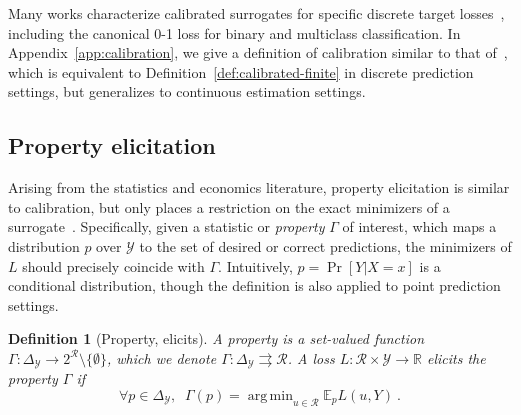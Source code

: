 \documentclass{article}
\newcommand{\Comments}{1}
\newcommand{\mynote}[2]{\ifnum\Comments=1\textcolor{#1}{#2}\fi}
\newcommand{\mytodo}[2]{\ifnum\Comments=1%
	\todo[linecolor=#1!80!black,backgroundcolor=#1,bordercolor=#1!80!black]{#2}\fi}
\newcommand{\raft}[1]{\mytodo{green!20!white}{RF: #1}}
\newcommand{\jessie}[1]{\mynote{purple}{[JF: #1]}}
\newcommand{\jessiet}[1]{\mytodo{purple!20!white}{JF: #1}}
\newcommand{\reals}{\mathbb{R}}
\newcommand{\simplex}{\Delta_\Y}
\newcommand{\E}{\mathbb{E}}
\newcommand{\R}{\mathcal{R}}
\newcommand{\Y}{\mathcal{Y}}
\newcommand{\exploss}[3]{\E_{#3} #1(#2,Y)}
\newcommand{\toto}{\rightrightarrows}
\newtheorem{definition}{Definition}
\DeclareMathOperator*{\argmin}{arg\,min}
\begin{document}
Many works characterize calibrated surrogates for specific discrete target losses~\citep{zhang2004statistical,lin2004note,bartlett2006convexity,tewari2007consistency}, including the canonical 0-1 loss for binary and multiclass classification.
In Appendix~\ref{app:calibration}, we give a definition of calibration similar to that of~\citet{steinwart2008support}, which is equivalent to Definition~\ref{def:calibrated-finite} in discrete prediction settings, but generalizes to continuous estimation settings.


\subsection{Property elicitation}\label{subsec:properties}
Arising from the statistics and economics literature, property elicitation is similar to calibration, but only places a restriction on the exact minimizers of a surrogate~\citep{savage1971elicitation,osband1985information-eliciting,lambert2008eliciting,lambert2009eliciting,lambert2018elicitation,frongillo2015vector-valued,frongillo2014general}.
Specifically, given a statistic or \emph{property} $\Gamma$ of interest, which maps a distribution $p$ over $\Y$ to the set of desired or correct predictions, the minimizers of $L$ should precisely coincide with $\Gamma$.
Intuitively, $p = \Pr[Y|X=x]$ is a conditional distribution, though the definition is also applied to point prediction settings.

\begin{definition}[Property, elicits]
	A \emph{property} is a set-valued function $\Gamma : \simplex \to 2^\R \setminus \{\emptyset\}$, which we denote $\Gamma: \simplex \toto \R$.
	A loss $L : \R \times \Y \to \reals$ \emph{elicits} the property $\Gamma$ if
	\begin{equation}
    \label{eq:elic}    
    \forall p \in \simplex, \;\; \Gamma(p) = \argmin_{u \in \R} \exploss{L}{u}{p}~.
	\end{equation}
\end{definition}
\end{document}
